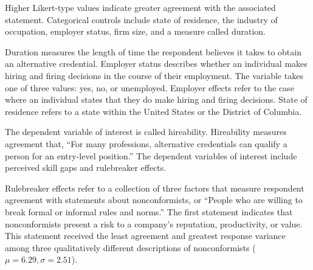 \documentclass[review]{elsarticle}
\begin{document}
Higher Likert-type values indicate greater agreement with the associated statement.
Categorical controls include state of residence,
the industry of occupation,
employer status,
firm size,
and a measure called duration.

Duration measures the length of time the respondent believes it takes to obtain an alternative credential.
Employer status describes whether an individual makes hiring and firing decisions in the course of their employment.
The variable takes one of three values: yes, no, or unemployed.
Employer effects refer to the case where an individual states that they do make hiring and firing decisions.
State of residence refers to a state within the United States or the District of Columbia.

The dependent variable of interest is called hireability.
Hireability measures agreement that, ``For many professions, alternative credentials can qualify a person for an entry-level position.''
The dependent variables of interest include perceived skill gaps and rulebreaker effects.

Rulebreaker effects refer to a collection of three factors that measure respondent agreement with statements about nonconformists, or ``People who are willing to break formal or informal rules and norms.''
The first statement indicates that nonconformists present a risk to a company's reputation, productivity, or value.
This statement received the least agreement and greatest response variance
among three qualitatively different descriptions of nonconformists ($\mu = 6.29, \sigma = 2.51$).
\end{document}
